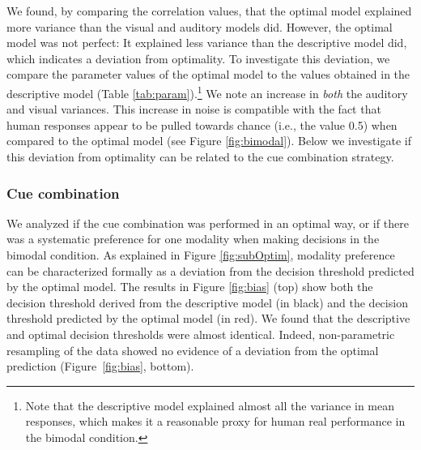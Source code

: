 \documentclass[english,,man,floatsintext]{apa6}
\let\rmarkdownfootnote\footnote%
\def\footnote{\protect\rmarkdownfootnote}
\theoremstyle{definition}
\theoremstyle{definition}
\theoremstyle{definition}
\theoremstyle{remark}
\begin{document}
We found, by comparing the correlation values, that the optimal model
explained more variance than the visual and auditory models did.
However, the optimal model was not perfect: It explained less variance
than the descriptive model did, which indicates a deviation from
optimality. To investigate this deviation, we compare the parameter
values of the optimal model to the values obtained in the descriptive
model (Table
\ref{tab:param}).\footnote{Note that the descriptive model explained almost all the variance in mean responses, which makes it a reasonable proxy for human real performance in the bimodal condition.}
We note an increase in \emph{both} the auditory and visual variances.
This increase in noise is compatible with the fact that human responses
appear to be pulled towards chance (i.e., the value 0.5) when compared
to the optimal model (see Figure \ref{fig:bimodal}). Below we
investigate if this deviation from optimality can be related to the cue
combination strategy.

\subsubsection{Cue combination}\label{cue-combination}

We analyzed if the cue combination was performed in an optimal way, or
if there was a systematic preference for one modality when making
decisions in the bimodal condition. As explained in Figure
\ref{fig:subOptim}, modality preference can be characterized formally as
a deviation from the decision threshold predicted by the optimal model.
The results in Figure \ref{fig:bias} (top) show both the decision
threshold derived from the descriptive model (in black) and the decision
threshold predicted by the optimal model (in red). We found that the
descriptive and optimal decision thresholds were almost identical.
Indeed, non-parametric resampling of the data showed no evidence of a
deviation from the optimal prediction (Figure~\ref{fig:bias}, bottom).
\end{document}
